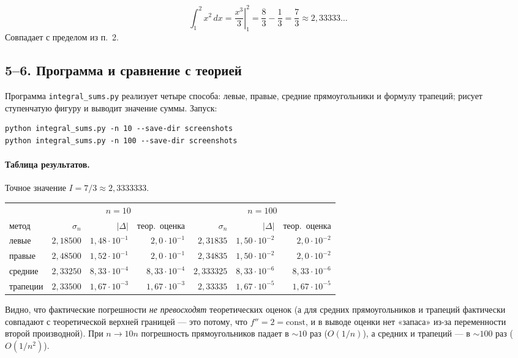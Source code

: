 \documentclass[12pt,a4paper]{article}
\begin{document}
\[
  \int_{1}^{2} x^2\,dx = \left.\frac{x^3}{3}\right|_{1}^{2}
  = \frac{8}{3}-\frac{1}{3} = \frac{7}{3} \approx 2{,}33333\ldots
\]
Совпадает с пределом из п.~2.

\subsection*{5--6. Программа и сравнение с теорией}

Программа \texttt{integral\_sums.py} реализует четыре способа: левые,
правые, средние прямоугольники и формулу трапеций; рисует ступенчатую
фигуру и выводит значение суммы. Запуск:
\begin{verbatim}
python integral_sums.py -n 10 --save-dir screenshots
python integral_sums.py -n 100 --save-dir screenshots
\end{verbatim}

\paragraph{Таблица результатов.} Точное значение $I=7/3\approx 2{,}3333333$.

\begin{center}
\begin{tabular}{l|rrr|rrr}
       & \multicolumn{3}{c|}{$n=10$} & \multicolumn{3}{c}{$n=100$}\\
метод  & $\sigma_n$ & $|\Delta|$ & теор.\ оценка
       & $\sigma_n$ & $|\Delta|$ & теор.\ оценка \\\hline
левые     & $2{,}18500$ & $1{,}48\!\cdot\!10^{-1}$ & $2{,}0\!\cdot\!10^{-1}$
          & $2{,}31835$ & $1{,}50\!\cdot\!10^{-2}$ & $2{,}0\!\cdot\!10^{-2}$\\
правые    & $2{,}48500$ & $1{,}52\!\cdot\!10^{-1}$ & $2{,}0\!\cdot\!10^{-1}$
          & $2{,}34835$ & $1{,}50\!\cdot\!10^{-2}$ & $2{,}0\!\cdot\!10^{-2}$\\
средние   & $2{,}33250$ & $8{,}33\!\cdot\!10^{-4}$ & $8{,}33\!\cdot\!10^{-4}$
          & $2{,}333325$& $8{,}33\!\cdot\!10^{-6}$ & $8{,}33\!\cdot\!10^{-6}$\\
трапеции  & $2{,}33500$ & $1{,}67\!\cdot\!10^{-3}$ & $1{,}67\!\cdot\!10^{-3}$
          & $2{,}33335$ & $1{,}67\!\cdot\!10^{-5}$ & $1{,}67\!\cdot\!10^{-5}$\\
\end{tabular}
\end{center}

Видно, что фактические погрешности \emph{не превосходят} теоретических
оценок (а для средних прямоугольников и трапеций фактически совпадают с
теоретической верхней границей --- это потому, что $f''=2=\mathrm{const}$,
и в выводе оценки нет «запаса» из-за переменности второй производной).
При $n\to10n$ погрешность прямоугольников падает в $\sim 10$ раз
($O(1/n)$), а средних и трапеций --- в $\sim 100$ раз ($O(1/n^2)$).
\end{document}
